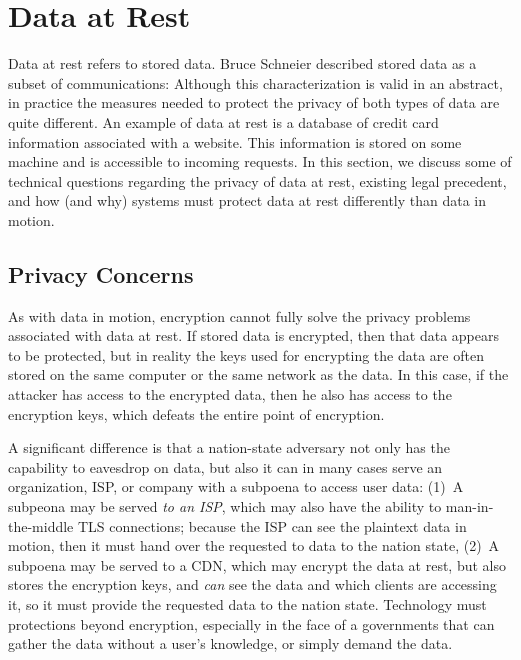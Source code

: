 \section{Data at Rest}
\label{sec:rest}

Data at rest refers to stored data. Bruce Schneier described stored data as a
subset of communications:  Although
this characterization is valid in an abstract, in practice the measures needed
to protect the privacy of both types of data are quite different.  An example
of data at rest is a database of credit card information associated with a
website. This information is stored on some machine and is accessible to
incoming requests. In this section, we discuss some of technical questions
regarding the privacy of data at rest, existing legal precedent, and how (and
why) systems must protect data at rest differently than data in motion.

\subsection{Privacy Concerns}  

As with data in motion, encryption cannot fully solve the privacy problems
associated with data at rest.  If stored data is encrypted, then that data
appears to be protected, but in reality the keys used for encrypting the data
are often stored on the same computer or the same network as the data.  In
this case, if the attacker has access to the encrypted data, then he also has
access to the encryption keys, which defeats the entire point of encryption.

A significant difference is that a nation-state adversary not only has the
capability to eavesdrop on data, but also it can in many cases serve an
organization, ISP, or company with a subpoena to access user data: (1)~A
subpeona may be served {\em to an ISP}, which may also have the ability to
man-in-the-middle TLS connections; because the ISP can see the plaintext data
in motion, then it must hand over the requested to data to the nation state,
(2)~A subpoena may be served to a CDN, which may encrypt the data at rest, but
also stores the encryption keys, and {\it can} see the data and which clients
are accessing it, so it must provide the requested data to the nation state.
Technology must protections beyond encryption, especially in the face of a
governments that can gather the data without a user's knowledge, or simply
demand the data.

